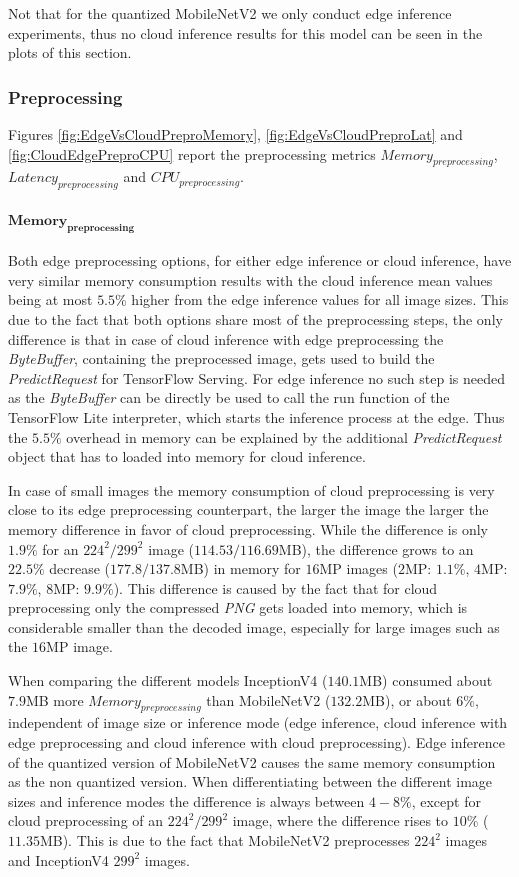 Not that for the quantized MobileNetV2 we only conduct edge inference experiments, thus no cloud inference results for this model can be seen in the plots of this section.
\subsubsection{Preprocessing}

Figures \ref{fig:EdgeVsCloudPreproMemory}, \ref{fig:EdgeVsCloudPreproLat} and \ref{fig:CloudEdgePreproCPU} report the preprocessing metrics $Memory_{preprocessing}$, $Latency_{preprocessing}$ and $CPU_{preprocessing}$.

\paragraph{$\mathbf{Memory_{preprocessing}}$}
Both edge preprocessing options, for either edge inference or cloud inference, have very similar memory consumption results with the cloud inference mean values being at most $5.5\%$ higher from the edge inference values for all image sizes.
This due to the fact that both options share most of the preprocessing steps, the only difference is that in case of cloud inference with edge preprocessing the \emph{ByteBuffer}, containing the preprocessed image, gets used to build the \emph{PredictRequest} for TensorFlow Serving. 
For edge inference no such step is needed as the \emph{ByteBuffer} can be directly be used to call the run function of the TensorFlow Lite interpreter, which starts the inference process at the edge.
Thus the $5.5\%$ overhead in memory can be explained by the additional \emph{PredictRequest} object that has to loaded into memory for cloud inference.

In case of small images the memory consumption of cloud preprocessing is very close to its edge preprocessing counterpart, the larger the image the larger the memory difference in favor of cloud preprocessing.
While the difference is only $1.9\%$ for an $224^2/299^2$ image ($114.53/116.69$MB), the difference grows to an $22.5\%$ decrease ($177.8/137.8$MB) in memory for $16$MP images ($2$MP: $1.1\%$, $4$MP: $7.9\%$, $8$MP: $9.9\%$).
This difference is caused by the fact that for cloud preprocessing only the compressed \emph{PNG} gets loaded into memory, which is considerable smaller than the decoded image, especially for large images such as the $16$MP image.

When comparing the different models InceptionV4 ($140.1$MB) consumed about $7.9$MB more $Memory_{preprocessing}$ than MobileNetV2 ($132.2$MB), or about $6\%$, independent of image size or inference mode (edge inference, cloud inference with edge preprocessing and cloud inference with cloud preprocessing).
Edge inference of the quantized version of MobileNetV2 causes the same memory consumption as the non quantized version.
When differentiating between the different image sizes and inference modes the difference is always between $4-8\%$, except for cloud preprocessing of an $224^2/299^2$ image, where the difference rises to $10\%$ ($11.35$MB). This is due to the fact that MobileNetV2 preprocesses $224^2$ images and InceptionV4 $299^2$ images.


